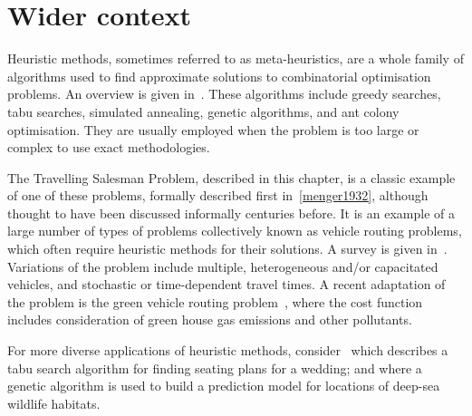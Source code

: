 \section{Wider context}\label{sec:heuristics_wider_context}

Heuristic methods, sometimes referred to as meta-heuristics, are a whole family
of algorithms used to find approximate solutions to combinatorial optimisation
problems. An overview is given in~\parencite{bozorg2017meta}. These algorithms
include greedy searches, tabu searches, simulated annealing, genetic algorithms,
and ant colony optimisation. They are usually employed when the problem is too
large or complex to use exact methodologies.

The Travelling Salesman Problem, described in this chapter, is a classic example
of one of these problems, formally described first in~\ref{menger1932}, although
thought to have been discussed informally centuries before.
It is an example of a large number of types of problems collectively known as
vehicle routing problems, which often require heuristic methods for their
solutions. A survey is given in~\parencite{braekers2016vehicle}. Variations of
the problem include multiple, heterogeneous and/or capacitated vehicles, and
stochastic or time-dependent travel times. A recent adaptation of the problem
is the green vehicle routing problem~\parencite{moghdani2021green}, where the
cost function includes consideration of green house gas emissions and other
pollutants.

For more diverse applications of heuristic methods,
consider~\parencite{lewis2016creating} which describes a tabu search algorithm
for finding seating plans for a wedding; and \parencite{tong2013modeling} where
a genetic algorithm is used to build a prediction model for locations of
deep-sea wildlife habitats.

